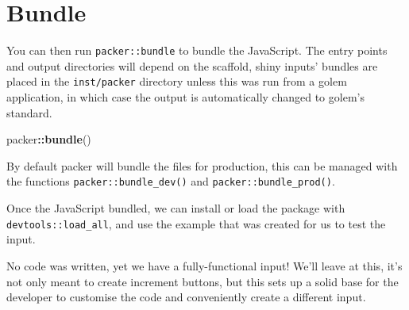 \documentclass[
  10pt,
]{krantz}
\makeatletter
\newenvironment{Shaded}{\begin{snugshade}}{\end{snugshade}}
\newcommand{\ControlFlowTok}[1]{\textcolor[rgb]{0.27,0.27,0.27}{\textbf{#1}}}
\newcommand{\DecValTok}[1]{\textcolor[rgb]{0.06,0.06,0.06}{#1}}
\newcommand{\KeywordTok}[1]{\textcolor[rgb]{0.27,0.27,0.27}{\textbf{#1}}}
\newcommand{\NormalTok}[1]{#1}
\newcommand{\OperatorTok}[1]{\textcolor[rgb]{0.43,0.43,0.43}{\textbf{#1}}}
\newcommand{\StringTok}[1]{\textcolor[rgb]{0.5,0.5,0.5}{#1}}
\newenvironment{kframe}{%
\medskip{}
\setlength{\fboxsep}{.8em}
 \def\at@end@of@kframe{}%
 \ifinner\ifhmode%
  \def\at@end@of@kframe{\end{minipage}}%
  \begin{minipage}{\columnwidth}%
 \fi\fi%
 \def\FrameCommand##1{\hskip\@totalleftmargin \hskip-\fboxsep
 \colorbox{shadecolor}{##1}\hskip-\fboxsep
     \hskip-\linewidth \hskip-\@totalleftmargin \hskip\columnwidth}%
 \MakeFramed {\advance\hsize-\width
   \@totalleftmargin\z@ \linewidth\hsize
   \@setminipage}}%
 {\par\unskip\endMakeFramed%
 \at@end@of@kframe}
\renewenvironment{Shaded}{\begin{kframe}}{\end{kframe}}
\makeatother
\begin{document}
\hypertarget{packer-bundle}{%
\section{Bundle}\label{packer-bundle}}

You can then run \texttt{packer::bundle} to bundle the JavaScript. The entry points and output directories will depend on the scaffold, shiny inputs' bundles are placed in the \texttt{inst/packer} directory unless this was run from a golem application, in which case the output is automatically changed to golem's standard.

\begin{Shaded}
\begin{Highlighting}[]
\NormalTok{packer}\OperatorTok{::}\KeywordTok{bundle}\NormalTok{()}
\end{Highlighting}
\end{Shaded}

By default packer will bundle the files for production, this can be managed with the functions \texttt{packer::bundle\_dev()} and \texttt{packer::bundle\_prod()}.

Once the JavaScript bundled, we can install or load the package with \texttt{devtools::load\_all}, and use the example that was created for us to test the input.

\begin{Shaded}
\end{Shaded}

No code was written, yet we have a fully-functional input! We'll leave at this, it's not only meant to create increment buttons, but this sets up a solid base for the developer to customise the code and conveniently create a different input.
\end{document}
